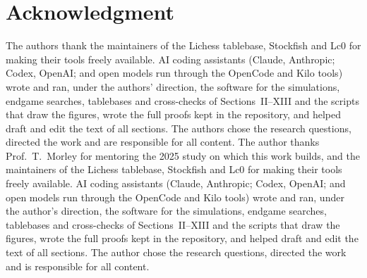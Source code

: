 \documentclass[journal]{IEEEtran}
\theoremstyle{ieeeplain}
\theoremstyle{ieeedef}
\begin{document}
\section*{Acknowledgment}
\ifdefined\anonbuild
The authors thank
the maintainers of the Lichess tablebase, Stockfish and Lc0 for making their tools freely available. AI
coding assistants (Claude, Anthropic; Codex, OpenAI; and open models run through the OpenCode and Kilo tools)
wrote and ran, under the authors' direction, the software for the simulations, endgame searches, tablebases
and cross-checks of Sections~II--XIII and the scripts that draw the figures, wrote the full proofs kept in
the repository, and helped draft and edit the
text of all sections. The authors chose the research questions, directed the work and are responsible for all
content.
\else
The author thanks
Prof.~T.~Morley for mentoring the 2025 study on which this work builds, and
the maintainers of the Lichess tablebase, Stockfish and Lc0 for making their tools freely available. AI
coding assistants (Claude, Anthropic; Codex, OpenAI; and open models run through the OpenCode and Kilo tools)
wrote and ran, under the author's direction, the software for the simulations, endgame searches, tablebases
and cross-checks of Sections~II--XIII and the scripts that draw the figures, wrote the full proofs kept in
the repository, and helped draft and edit the
text of all sections. The author chose the research questions, directed the work and is responsible for all
content.
\fi




\end{document}
